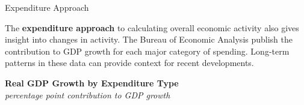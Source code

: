 \documentclass{report}
\begin{document}
\begin{minipage}{1.0\textwidth}   
\normalsize Expenditure Approach
\vspace{-1mm}

\small The \textbf{expenditure approach} to calculating overall economic activity also gives insight into changes in activity. The Bureau of Economic Analysis publish the contribution to GDP growth for each major category of spending. Long-term patterns in these data can provide context for recent developments. 




\vspace{1mm}

\normalsize \textbf{Real GDP Growth by Expenditure Type}\\
\footnotesize{\textit{percentage point contribution to GDP growth}}
\vspace{4.2cm}


\end{minipage}
\end{document}
